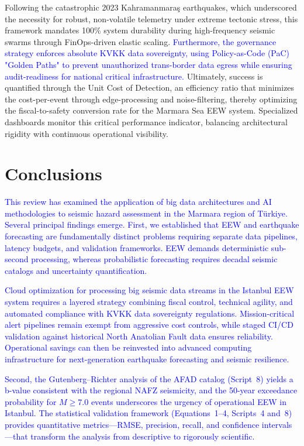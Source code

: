\documentclass[data,article,submit,pdftex,moreauthors]{Definitions/mdpi}
\begin{document}
Following the catastrophic 2023 Kahramanmaraş earthquakes, which underscored the necessity for robust, non-volatile telemetry under extreme tectonic stress, this framework mandates 100\% system durability during high-frequency seismic swarms through FinOps-driven elastic scaling. \textcolor{blue}{Furthermore, the governance strategy enforces absolute KVKK data sovereignty, using Policy-as-Code (PaC) "Golden Paths" to prevent unauthorized trans-border data egress while ensuring audit-readiness for national critical infrastructure.} Ultimately, success is quantified through the Unit Cost of Detection, an efficiency ratio that minimizes the cost-per-event through edge-processing and noise-filtering, thereby optimizing the fiscal-to-safety conversion rate for the Marmara Sea EEW system. Specialized dashboards monitor this critical performance indicator, balancing architectural rigidity with continuous operational visibility.

\section{Conclusions}

\textcolor{blue}{This review has examined the application of big data architectures and AI methodologies to seismic hazard assessment in the Marmara region of Türkiye.} \textcolor{blue}{Several principal findings emerge.} \textcolor{blue}{First, we established that EEW and earthquake forecasting are fundamentally distinct problems requiring separate data pipelines, latency budgets, and validation frameworks.} \textcolor{blue}{EEW demands deterministic sub-second processing, whereas probabilistic forecasting requires decadal seismic catalogs and uncertainty quantification.} 

\textcolor{blue}{Cloud optimization for processing big seismic data streams in the Istanbul EEW system requires a layered strategy combining fiscal control, technical agility, and automated compliance with KVKK data sovereignty regulations. Mission-critical alert pipelines remain exempt from aggressive cost controls, while staged CI/CD validation against historical North Anatolian Fault data ensures reliability. Operational savings can then be reinvested into advanced computing infrastructure for next-generation earthquake forecasting and seismic resilience.}

\textcolor{blue}{Second, the Gutenberg--Richter analysis of the AFAD catalog (Script~8) yields a b-value consistent with the regional NAFZ seismicity, and the 50-year exceedance probability for $M \geq 7.0$ events underscores the urgency of operational EEW in Istanbul. The statistical validation framework (Equations~1--4, Scripts~4 and~8) provides quantitative metrics—RMSE, precision, recall, and confidence intervals—that transform the analysis from descriptive to rigorously scientific.}
\end{document}
